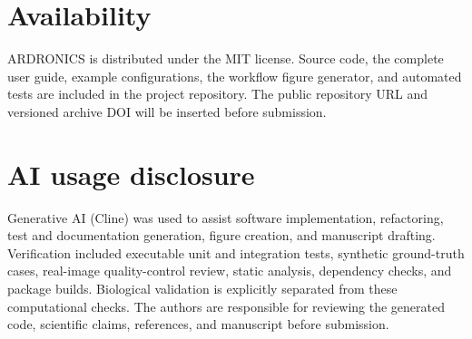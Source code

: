 \documentclass[
  11pt]{article}
\begin{document}
\section{Availability}\label{availability}

ARDRONICS is distributed under the MIT license. Source code, the
complete user guide, example configurations, the workflow figure
generator, and automated tests are included in the project repository.
The public repository URL and versioned archive DOI will be inserted
before submission.

\section{AI usage disclosure}\label{ai-usage-disclosure}

Generative AI (Cline) was used to assist software implementation,
refactoring, test and documentation generation, figure creation, and
manuscript drafting. Verification included executable unit and
integration tests, synthetic ground-truth cases, real-image
quality-control review, static analysis, dependency checks, and package
builds. Biological validation is explicitly separated from these
computational checks. The authors are responsible for reviewing the
generated code, scientific claims, references, and manuscript before
submission.

\renewcommand\refname{References}

\end{document}
